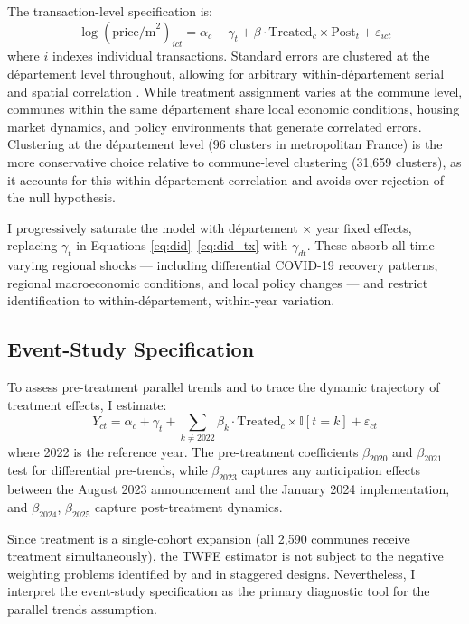 \documentclass[12pt]{article}
\newcommand{\ind}{\mathbb{I}}
\begin{document}
The transaction-level specification is:
\begin{equation}
    \log(\text{price/m}^2)_{ict} = \alpha_c + \gamma_t + \beta \cdot \text{Treated}_c \times \text{Post}_t + \varepsilon_{ict}
    \label{eq:did_tx}
\end{equation}
where $i$ indexes individual transactions. Standard errors are clustered at the d\'epartement level throughout, allowing for arbitrary within-d\'epartement serial and spatial correlation \citep{bertrand2004}. While treatment assignment varies at the commune level, communes within the same d\'epartement share local economic conditions, housing market dynamics, and policy environments that generate correlated errors. Clustering at the d\'epartement level (96 clusters in metropolitan France) is the more conservative choice relative to commune-level clustering (31,659 clusters), as it accounts for this within-d\'epartement correlation and avoids over-rejection of the null hypothesis.

I progressively saturate the model with d\'epartement $\times$ year fixed effects, replacing $\gamma_t$ in Equations \ref{eq:did}--\ref{eq:did_tx} with $\gamma_{dt}$. These absorb all time-varying regional shocks --- including differential COVID-19 recovery patterns, regional macroeconomic conditions, and local policy changes --- and restrict identification to within-d\'epartement, within-year variation.

\subsection{Event-Study Specification}

To assess pre-treatment parallel trends and to trace the dynamic trajectory of treatment effects, I estimate:
\begin{equation}
    Y_{ct} = \alpha_c + \gamma_t + \sum_{k \neq 2022} \beta_k \cdot \text{Treated}_c \times \ind[t = k] + \varepsilon_{ct}
    \label{eq:es}
\end{equation}
where 2022 is the reference year. The pre-treatment coefficients $\beta_{2020}$ and $\beta_{2021}$ test for differential pre-trends, while $\beta_{2023}$ captures any anticipation effects between the August 2023 announcement and the January 2024 implementation, and $\beta_{2024}$, $\beta_{2025}$ capture post-treatment dynamics.

Since treatment is a single-cohort expansion (all 2,590 communes receive treatment simultaneously), the TWFE estimator is not subject to the negative weighting problems identified by \citet{goodman2021} and \citet{sun2021} in staggered designs. Nevertheless, I interpret the event-study specification as the primary diagnostic tool for the parallel trends assumption.
\end{document}
